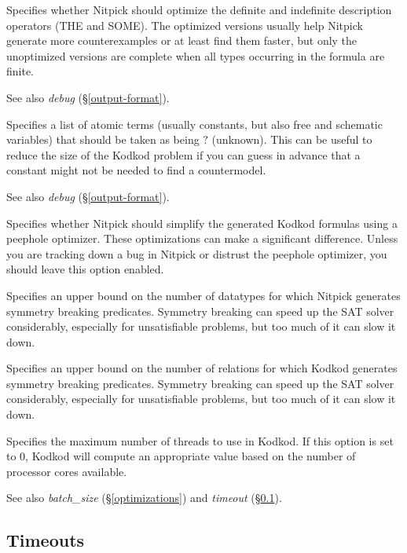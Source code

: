 \documentclass[a4paper,12pt]{article}
\def\unk{{?}}
\begin{document}
\begin{enum}
Specifies whether Nitpick should optimize the definite and indefinite
description operators (THE and SOME). The optimized versions usually help
Nitpick generate more counterexamples or at least find them faster, but only the
unoptimized versions are complete when all types occurring in the formula are
finite.

{\small See also \textit{debug} (\S\ref{output-format}).}

Specifies a list of atomic terms (usually constants, but also free and schematic
variables) that should be taken as being $\unk$ (unknown). This can be useful to
reduce the size of the Kodkod problem if you can guess in advance that a
constant might not be needed to find a countermodel.

{\small See also \textit{debug} (\S\ref{output-format}).}

Specifies whether Nitpick should simplify the generated Kodkod formulas using a
peephole optimizer. These optimizations can make a significant difference.
Unless you are tracking down a bug in Nitpick or distrust the peephole
optimizer, you should leave this option enabled.

Specifies an upper bound on the number of datatypes for which Nitpick generates
symmetry breaking predicates. Symmetry breaking can speed up the SAT solver
considerably, especially for unsatisfiable problems, but too much of it can slow
it down.

Specifies an upper bound on the number of relations for which Kodkod generates
symmetry breaking predicates. Symmetry breaking can speed up the SAT solver
considerably, especially for unsatisfiable problems, but too much of it can slow
it down.

Specifies the maximum number of threads to use in Kodkod. If this option is set
to 0, Kodkod will compute an appropriate value based on the number of processor
cores available.

\nopagebreak
{\small See also \textit{batch\_size} (\S\ref{optimizations}) and
\textit{timeout} (\S\ref{timeouts}).}
\end{enum}

\subsection{Timeouts}
\label{timeouts}
\end{document}
